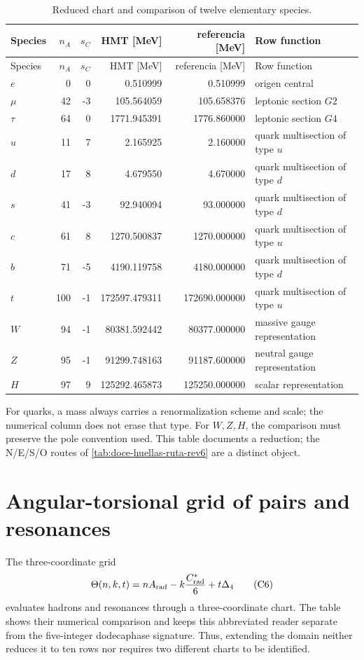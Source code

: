 \begin{longtable}{@{}lrrrrL{0.22\textwidth}@{}}
\caption{Reduced chart and comparison of twelve elementary species.}
\label{tab:doce-control-inverso-rev6}\\
\toprule
Species&\(n_A\)&\(s_C\)&{HMT [MeV]}&{referencia [MeV]}&Row function\\
\midrule
\endfirsthead
\toprule
Species&\(n_A\)&\(s_C\)&{HMT [MeV]}&{referencia [MeV]}&Row function\\
\midrule
\endhead
\(e\)&0&0&0.510999&0.510999&origen central\\
\(\mu\)&42&-3&105.564059&105.658376&leptonic section \(G2\)\\
\(\tau\)&64&0&1771.945391&1776.860000&leptonic section \(G4\)\\
\(u\)&11&7&2.165925&2.160000&quark multisection of type \(u\)\\
\(d\)&17&8&4.679550&4.670000&quark multisection of type \(d\)\\
\(s\)&41&-3&92.940094&93.000000&quark multisection of type \(d\)\\
\(c\)&61&8&1270.500837&1270.000000&quark multisection of type \(u\)\\
\(b\)&71&-5&4190.119758&4180.000000&quark multisection of type \(d\)\\
\(t\)&100&-1&172597.479311&172690.000000&quark multisection of type \(u\)\\
\(W\)&94&-1&80381.592442&80377.000000&massive gauge representation\\
\(Z\)&95&-1&91299.748163&91187.600000&neutral gauge representation\\
\(H\)&97&9&125292.465873&125250.000000&scalar representation\\
\bottomrule
\end{longtable}

For quarks, a mass always carries a renormalization scheme and scale;
the numerical column does not erase that type. For \(W,Z,H\), the
comparison must preserve the pole convention used. This table
documents a reduction; the N/E/S/O routes of
\cref{tab:doce-huellas-ruta-rev6} are a distinct object.

\section{Angular-torsional grid of pairs and resonances}

The three-coordinate grid
\[
\Theta(n,k,t)
=nA_{\rm rad}-k\frac{C^*_{\rm rad}}6+t\Delta_4
\tag{C6}\label{eq:malla-extendida-resonancias-rev6}
\]
evaluates hadrons and resonances through a three-coordinate chart. The table
shows their numerical comparison and keeps this abbreviated reader separate from
the five-integer dodecaphase signature. Thus, extending the domain neither
reduces it to ten rows nor requires two different charts to be identified.

